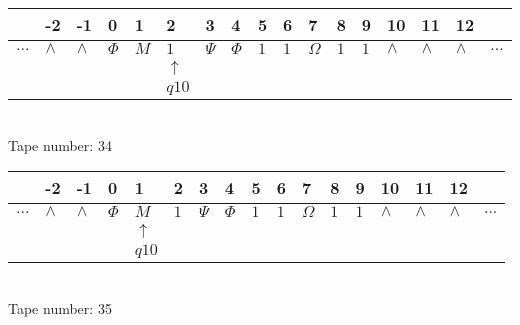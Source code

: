 \documentclass{article}
\begin{document}
\begin{table}[H]
\centering
\begin{tabular}{lllllllllllllllll}
 & -2 & -1 & 0 & 1 & 2 & 3 & 4 & 5 & 6 & 7 & 8 & 9 & 10 & 11 & 12 & \\
\hline
$...$ & \multicolumn{1}{|l|}{$\wedge$} & \multicolumn{1}{|l|}{$\wedge$} & \multicolumn{1}{|l|}{$\Phi$} & \multicolumn{1}{|l|}{$M$} & \multicolumn{1}{|l|}{$1$} & \multicolumn{1}{|l|}{$\Psi$} & \multicolumn{1}{|l|}{$\Phi$} & \multicolumn{1}{|l|}{$1$} & \multicolumn{1}{|l|}{$1$} & \multicolumn{1}{|l|}{$\Omega$} & \multicolumn{1}{|l|}{$1$} & \multicolumn{1}{|l|}{$1$} & \multicolumn{1}{|l|}{$\wedge$} & \multicolumn{1}{|l|}{$\wedge$} & \multicolumn{1}{|l|}{$\wedge$} & $...$\\
\hline
&  &  &  &  & $\uparrow$ &  &  &  &  &  &  &  &  &  &  &  \\
&  &  &  &  & $ q10 $ &  &  &  &  &  &  &  &  &  &  &  \\
\end{tabular}
\\
Tape number: 34
\noindent\makebox[\linewidth]{\hdashrule{\textwidth}{1pt}{1pt}}\end{table}

\begin{table}[H]
\centering
\begin{tabular}{lllllllllllllllll}
 & -2 & -1 & 0 & 1 & 2 & 3 & 4 & 5 & 6 & 7 & 8 & 9 & 10 & 11 & 12 & \\
\hline
$...$ & \multicolumn{1}{|l|}{$\wedge$} & \multicolumn{1}{|l|}{$\wedge$} & \multicolumn{1}{|l|}{$\Phi$} & \multicolumn{1}{|l|}{$M$} & \multicolumn{1}{|l|}{$1$} & \multicolumn{1}{|l|}{$\Psi$} & \multicolumn{1}{|l|}{$\Phi$} & \multicolumn{1}{|l|}{$1$} & \multicolumn{1}{|l|}{$1$} & \multicolumn{1}{|l|}{$\Omega$} & \multicolumn{1}{|l|}{$1$} & \multicolumn{1}{|l|}{$1$} & \multicolumn{1}{|l|}{$\wedge$} & \multicolumn{1}{|l|}{$\wedge$} & \multicolumn{1}{|l|}{$\wedge$} & $...$\\
\hline
&  &  &  & $\uparrow$ &  &  &  &  &  &  &  &  &  &  &  &  \\
&  &  &  & $ q10 $ &  &  &  &  &  &  &  &  &  &  &  &  \\
\end{tabular}
\\
Tape number: 35
\noindent\makebox[\linewidth]{\hdashrule{\textwidth}{1pt}{1pt}}\end{table}
\clearpage
\end{document}
